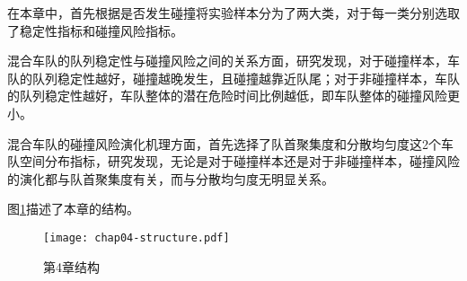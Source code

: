 在本章中，首先根据是否发生碰撞将实验样本分为了两大类，对于每一类分别选取了稳定性指标和碰撞风险指标。

混合车队的队列稳定性与碰撞风险之间的关系方面，研究发现，对于碰撞样本，车队的队列稳定性越好，碰撞越晚发生，且碰撞越靠近队尾；对于非碰撞样本，车队的队列稳定性越好，车队整体的潜在危险时间比例越低，即车队整体的碰撞风险更小。

混合车队的碰撞风险演化机理方面，首先选择了队首聚集度和分散均匀度这2个车队空间分布指标，研究发现，无论是对于碰撞样本还是对于非碰撞样本，碰撞风险的演化都与队首聚集度有关，而与分散均匀度无明显关系。

图\ref{fig:chap04-strcture}描述了本章的结构。

\begin{figure}
    \centering
    \texttt{[image: chap04-structure.pdf]}
    \caption{第4章结构}
    \label{fig:chap04-strcture}
\end{figure} 

